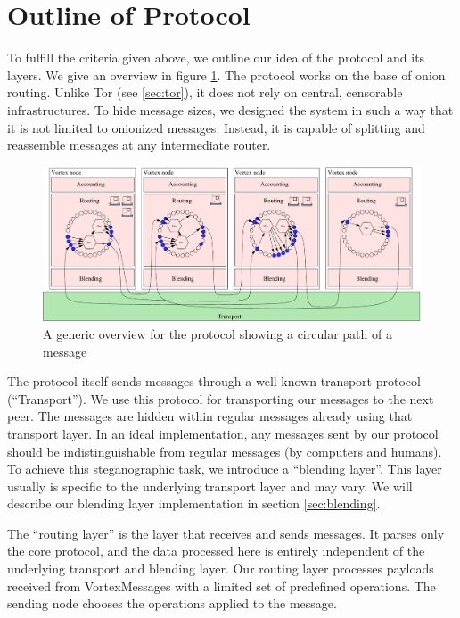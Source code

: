 \section{Outline of Protocol}
To fulfill the criteria given above, we outline our idea of the protocol and its layers. We give an overview in figure \ref{fig:roughProtocolDesign}. The protocol works on the base of onion routing. Unlike Tor (see \ref{sec:tor}), it does not rely on central, censorable infrastructures. To hide message sizes, we designed the system in such a way that it is not limited to onionized messages. Instead, it is capable of splitting and reassemble messages at any intermediate router.

\begin{figure}[ht]
	\includegraphics[width=\columnwidth]{inc/roughProtocolDesign.pdf}
	\caption{A generic overview for the protocol showing a circular path of a message}
	\label{fig:roughProtocolDesign}
\end{figure}    

The protocol itself sends messages through a well-known transport protocol (``Transport''). We use this protocol for transporting our messages to the next peer. The messages are hidden within regular messages already using that transport layer. In an ideal implementation, any messages sent by our protocol should be indistinguishable from regular messages (by computers and humans). To achieve this steganographic task, we introduce a ``blending layer''. This layer usually is specific to the underlying transport layer and may vary. We will describe our blending layer implementation in section \ref{sec:blending}.

The ``routing layer'' is the layer that receives and sends messages. It parses only the core protocol, and the data processed here is entirely independent of the underlying transport and blending layer. Our routing layer processes payloads received from VortexMessages with a limited set of predefined operations. The sending node chooses the operations applied to the message.

